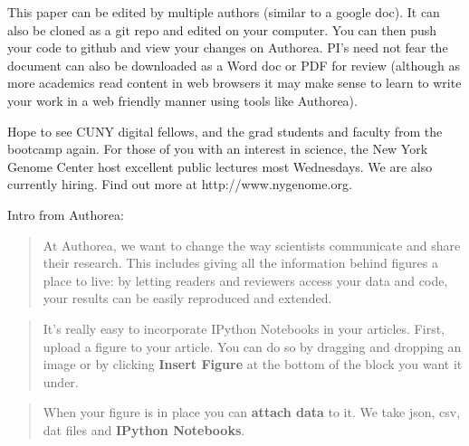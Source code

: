 This paper can be edited by multiple authors (similar to a google doc). It can also be cloned as a git repo and edited on your computer. You can then push your code to github and view your changes on Authorea. PI's need not fear the document can also be downloaded as a Word doc or PDF for review (although as more academics read content in web browsers it may make sense to learn to write your work in a web friendly manner using tools like Authorea).

Hope to see CUNY digital fellows, and the grad students and faculty from the bootcamp again. For those of you with an interest in science, the New York Genome Center host excellent public lectures most Wednesdays. We are also currently hiring. Find out more at http://www.nygenome.org.

Intro from Authorea: 
\begin{quote}
At Authorea, we want to change the way scientists communicate and share their research. This includes giving all the information behind figures a place to live: by letting readers and reviewers access your data and code, your results can be easily reproduced and extended.
\end{quote}

\begin{quote}
It's really easy to incorporate IPython Notebooks in your articles.  First, upload a figure to your article. You can do so by dragging and dropping an image or by clicking \textbf{Insert Figure} at the bottom of the block you want it under.  
\end{quote}

\begin{quote}
When your figure is in place you can \textbf{attach data} to it. We take json, csv, dat files and \textbf{IPython Notebooks}. 
\end{quote}